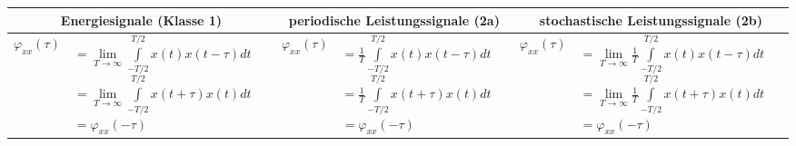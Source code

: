 		\bgroup
		\setlength{\tabcolsep}{1mm}
		\begin{tabularx}{\textwidth}{|cX|cX|cX|}
		\hline 
			\multicolumn{2}{|c|}{\textbf{Energiesignale} (Klasse 1)} &
			\multicolumn{2}{|c|}{\textbf{periodische Leistungssignale} (2a)} & 
			\multicolumn{2}{|c|}{\textbf{stochastische Leistungssignale} (2b)}
		\\ \hline 
			$ \varphi_{xx}(\tau) $ &
			$ 		= \lim\limits_{T\to\infty}\int\limits_{-T/2}^{T/2} x(t)x(t-\tau)dt $ \linebreak
				$ 	= \lim\limits_{T\to\infty}\int\limits_{-T/2}^{T/2} x(t+\tau)x(t)dt $ \linebreak
				$	= \varphi_{xx}(-\tau)$ &
			$ \varphi_{xx}(\tau) $ &
			$ 		= \frac {1} {T} \int\limits_{-T/2}^{T/2} x(t)x(t-\tau)dt $ \linebreak
				$	= \frac {1} {T} \int\limits_{-T/2}^{T/2} x(t+\tau)x(t)dt $ \linebreak
				$	= \varphi_{xx}(-\tau) $ &
			$ \varphi_{xx}(\tau) $ &
			$		= \lim\limits_{T\rightarrow\infty} \frac {1} {T} \int\limits_{-T/2}^{T/2} x(t)x(t-\tau)dt $ \linebreak
				$	= \lim\limits_{T\rightarrow\infty}\frac {1} {T} \int\limits_{-T/2}^{T/2} x(t+\tau)x(t)dt $ \linebreak
				$	= \varphi_{xx}(-\tau) $
		\\ \hline
		\end{tabularx} 
		\egroup
		
